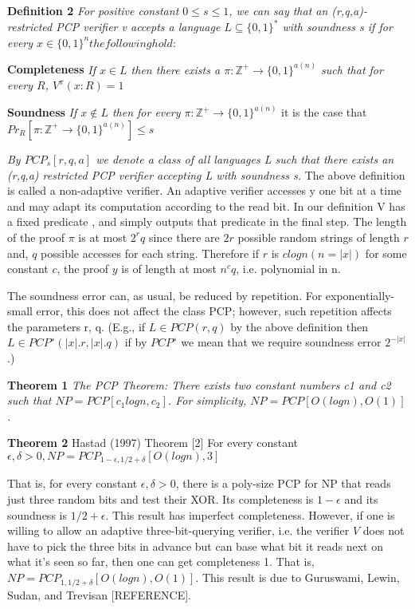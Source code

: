 \textbf{Definition 2} \textit{For positive constant $0 \leq s \leq 1$, we can say that an (r,q,a)-restricted PCP verifier v accepts a language $L \subseteq \{0,1\}^*$ with soundness s if for every $x \in \{0,1\}^n the following hold:$}

\textbf{Completeness} \textit{If $x \in L$ then there exists a $\pi : \mathbb{Z}^+ \rightarrow \{0,1\}^{a(n)}$ such that for every $R$, $V^{\pi}(x:R) = 1$}

\textbf{Soundness} \textit{If $x \notin L$ then for every $\pi : \mathbb{Z}^+ \rightarrow \{0,1\}^{a(n)}$} it is the case that $Pr_R[\pi : \mathbb{Z}^+ \rightarrow \{0,1\}^{a(n)}] \leq s$

\textit{By $PCP_s[r,q,a]$ we denote a class of all languages L such that there exists an (r,q,a) restricted PCP verifier accepting L with soundness s.} The above definition is called a non-adaptive verifier. An adaptive verifier accesses y one bit at a time and may adapt its computation according to the read bit. In our definition V has a fixed predicate , and simply outputs that predicate in the final step. The length of the proof $\pi$ is at most $2^rq$ since there are $2r$ possible random strings of length $r$ and, $q$ possible accesses for each string. Therefore if $r$ is $c log n(n = |x|)$ for some constant $c$, the proof $y$ is of length at most $n^cq$, i.e. polynomial in n.

The soundness error can, as usual, be reduced by repetition. For exponentially-small error, this does not affect the class PCP; however, such repetition affects the parameters r, q. (E.g., if $L \in PCP(r, q)$ by the above definition then $L \in PCP^∗(|x|.r, |x|.q)$ if by $PCP^∗$ we mean that we require soundness error $2^{−|x|}$.)

\textbf{Theorem 1} \textit{The PCP Theorem: There exists two constant numbers c1 and c2 such that $NP = PCP[c_1 log n, c_2]$. For simplicity, $NP = PCP[O(log n), O(1)]$.}

\textbf{Theorem 2} Hastad (1997) Theorem [2] For every constant $\epsilon, \delta > 0, NP = PCP_{1 - \epsilon,1/2+\delta} [O(log n), 3]$ 

That is, for every constant $\epsilon, \delta > 0$, there is a poly-size PCP for NP that reads just three random bits and test their XOR. Its completeness is $1 - \epsilon$ and its soundness is $1/2 + \epsilon$. This result has imperfect completeness. However, if one is willing to allow an adaptive three-bit-querying verifier, i.e. the verifier $V$ does not have to pick the three bits in advance but can base what bit it reads next on what it’s seen so far, then one can get completeness 1. That is, $NP = PCP_{1,1/2+\delta}[O(log n), O(1)]$. This result is due to Guruswami, Lewin,
Sudan, and Trevisan [REFERENCE].

